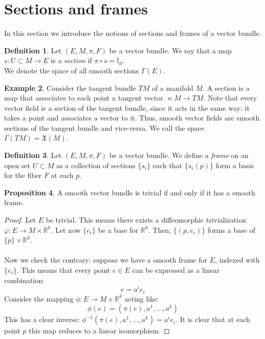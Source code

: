\documentclass[12pt,a4paper]{report}
\theoremstyle{definition}
\newtheorem{Def}{Definition}[chapter]
\theoremstyle{Theorem}
\newtheorem{Prop}[Def]{Proposition}
\theoremstyle{definition}
\newtheorem{Ex}[Def]{Example}
\theoremstyle{definition}
\begin{document}
		
		\section{Sections and frames}
			In this section we introduce the notions of sections and frames of a vector bundle.
		\begin{Def}\label{Def_5.5}
			Let $(E,M,\pi,F)$ be a vector bundle. We say that a map \\$s:U\subset M\rightarrow E$ is a \textit{section} if $\pi\circ s=\mathbb{I}_d$. \\
			We denote the space of all smooth sections $\Gamma(E)$.
		\end{Def}
		\begin{Ex}
			Consider the tangent bundle $TM$ of a manifold $M$. A section is a map that associates to each point a tangent vector. $s:M\rightarrow TM$. Note that every vector field is a section of the tangent bundle, since it acts in the same way: it takes a point and associates a vector to it. Thus, smooth vector fields are smooth sections of the tangent bundle and vice-versa. We call the space $\Gamma(TM)=\mathfrak{X}(M)$.
		\end{Ex}
		\begin{Def}\label{Def_5.6}
			Let $(E,M,\pi,F)$ be a vector bundle. We define a \textit{frame} on an open set $U\subset M$ as a collection of sections $\{s_i\}$ such that $\{s_i(p)\}$ form a basis for the fiber $F$ at each $p$. 
		\end{Def}
		\begin{Prop}
			A smooth vector bundle is trivial if and only if it has a smooth frame.
		\end{Prop}
		\begin{proof}
			Let $E$ be trivial. This means there exists a diffeomorphic trivialization $\varphi:E\rightarrow M\times \mathbb{R}^k$. Let now $\{e_i\}$ be a base for $\mathbb{R}^k$. Then, $\{(p,e_i)\}$ forms a base of $\{p\}\times \mathbb{R}^k$.
			\\\\
			Now we check the contrary: suppose we have a smooth frame for $E$, indexed with $\{e_i\}$. This means that every point $e\in E$ can be expressed as a linear combination:
			$$e=a^ie_i$$
			Consider the mapping $\phi:E\rightarrow M\times\mathbb{R}^k$ acting like:
			$$\phi(e)=(\pi(e),a^1,...,a^k)$$
			This has a clear inverse: $\phi^{-1}(\pi(e),a^1,...,a^k)=a^ie_i$.
			It is clear that at each point $p$ this map reduces to a linear isomorphism.
		\end{proof}
\end{document}
